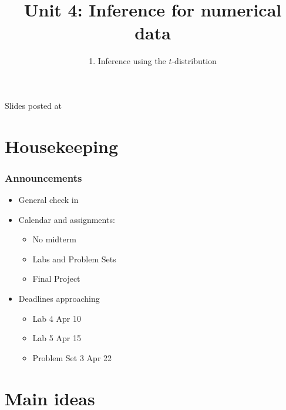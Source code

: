 \documentclass[t,compress,mathserif,11pt,t,professionalfonts,xcolor=table]{beamer}
\title{Unit 4: Inference for numerical data}
\subtitle{1. Inference using the $t$-distribution}
\author{\CourseName}
\date{}
\institute{\InstituteName}
\begin{document}



\begin{frame}[plain]

\titlepage

\vfill

{\scriptsize {} \hfill Slides posted at  \webURL{\CourseSite}}

\addtocounter{framenumber}{-1} 

\end{frame}


\section{Housekeeping}
%
%
\begin{frame}
\frametitle{Announcements}

\begin{itemize}
\item General check in \pause
\item Calendar and assignments: \pause
\begin{itemize}
	\item No midterm
	\item Labs and Problem Sets
	\item Final Project \pause
\end{itemize}
\item Deadlines approaching \pause
\begin{itemize}
	\item Lab 4 Apr 10
	\item Lab 5 Apr 15
	\item Problem Set 3 Apr 22
\end{itemize}
\end{itemize}

\end{frame}


\section{Main ideas}

\end{document}
